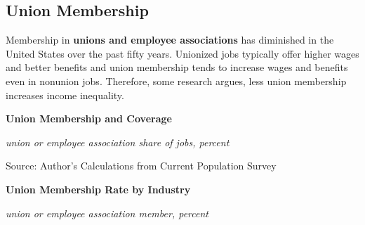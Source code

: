 \documentclass{report}
\makeatletter
\newcommand{\tbllink}[1]{\href{https://raw.githubusercontent.com/bdecon/US-chartbook/master/chartbook/data/#1}{\faTable}}
\newcommand*\short[1]{\expandafter\@gobbletwo\number\numexpr#1\relax}
\newcommand{\ctsbar}[5]{
		\addplot[ybar stacked, bar width=#5, draw opacity=0, fill=#1] 
			table [x=#2, y=#3, col sep=comma]{#4};}
\newcommand{\dateaxisticks}{
		date coordinates in=x, axis line style={draw=none},
		xmax={2020-08-10},
		max space between ticks=40,	    
		xtick={{1990-01-01}, {1992-01-01}, {1994-01-01}, 
			{1996-01-01}, {1998-01-01}, {2000-01-01}, 
			{2002-01-01}, {2004-01-01}, {2006-01-01},
			{2008-01-01}, {2010-01-01}, {2012-01-01}, {2014-01-01},
		    {2016-01-01}, {2018-01-01}, {2020-01-01}},
		minor xtick={{1989-01-01}, {1991-01-01}, {1993-01-01},
			{1995-01-01}, {1997-01-01}, {1999-01-01}, 
			{2001-01-01}, {2003-01-01}, {2005-01-01}, {2007-01-01},
		    {2009-01-01}, {2011-01-01}, {2013-01-01}, {2015-01-01},
		    {2017-01-01}, {2019-01-01}},
		enlarge y limits={0.06}, enlarge x limits={0.01},
		}
\newcommand{\bbar}[2]{extra #1 ticks = {{#2}}, extra #1 tick labels = ,
		extra #1 tick style = {grid=major, grid style={thick, black!25}},}
\newcommand{\rbars}{
		\fill[color=black!10] (axis cs:{1990-07-01},\pgfkeysvalueof{/pgfplots/ymin}) rectangle 
			(axis cs:{1991-03-01}, \pgfkeysvalueof{/pgfplots/ymax});
		\fill[color=black!10] (axis cs:{2007-12-01},\pgfkeysvalueof{/pgfplots/ymin}) rectangle 
			(axis cs:{2009-07-01}, \pgfkeysvalueof{/pgfplots/ymax});
		\fill[color=black!10] (axis cs:{2001-03-01},\pgfkeysvalueof{/pgfplots/ymin}) rectangle 
			(axis cs:{2001-11-01}, \pgfkeysvalueof{/pgfplots/ymax});
		\fill[color=black!10] (axis cs:{2020-02-01},\pgfkeysvalueof{/pgfplots/ymin}) rectangle 
			(axis cs:{2020-09-01}, \pgfkeysvalueof{/pgfplots/ymax});}
\makeatother
\begin{document}
{{{{{{{{{\begin{minipage}{0.76\textwidth}
\end{minipage}

\newpage

\begin{minipage}{0.76\textwidth}

\subsection*{\color{black!70} \seriffont Union Membership}

\small Membership in \textbf{unions and employee associations} has diminished in the United States over the past fifty years. Unionized jobs typically offer higher wages and better benefits and union membership tends to increase wages and benefits even in nonunion jobs. Therefore, some research argues, less union membership increases income inequality. \\



\vspace{5mm}

\normalsize \textbf{Union Membership and Coverage}

\footnotesize{\textit{union or employee association share of jobs, percent}}

\hspace*{-2mm} 

\footnotesize{Source: Author's Calculations from Current Population Survey} \hfill \tbllink{union.csv}
\end{minipage}

\vspace{4mm}

\begin{minipage}{0.43\textwidth}

\normalsize \textbf{Union Membership Rate by Industry}

\footnotesize{\textit{union or employee association member, percent}}


\end{minipage}}}}}}}}}}
\end{document}
